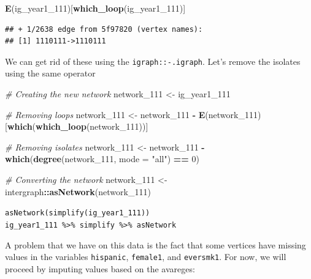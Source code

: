 \documentclass[]{book}
\newenvironment{Shaded}{\begin{snugshade}}{\end{snugshade}}
\newcommand{\CommentTok}[1]{\textcolor[rgb]{0.56,0.35,0.01}{\textit{#1}}}
\newcommand{\DataTypeTok}[1]{\textcolor[rgb]{0.13,0.29,0.53}{#1}}
\newcommand{\DecValTok}[1]{\textcolor[rgb]{0.00,0.00,0.81}{#1}}
\newcommand{\KeywordTok}[1]{\textcolor[rgb]{0.13,0.29,0.53}{\textbf{#1}}}
\newcommand{\NormalTok}[1]{#1}
\newcommand{\OperatorTok}[1]{\textcolor[rgb]{0.81,0.36,0.00}{\textbf{#1}}}
\newcommand{\StringTok}[1]{\textcolor[rgb]{0.31,0.60,0.02}{#1}}
\begin{document}
\begin{Shaded}
\begin{Highlighting}[]
\KeywordTok{E}\NormalTok{(ig_year1_}\DecValTok{111}\NormalTok{)[}\KeywordTok{which_loop}\NormalTok{(ig_year1_}\DecValTok{111}\NormalTok{)]}
\end{Highlighting}
\end{Shaded}

\begin{verbatim}
## + 1/2638 edge from 5f97820 (vertex names):
## [1] 1110111->1110111
\end{verbatim}

We can get rid of these using the \texttt{igraph::-.igraph}. Let's remove the isolates using the same operator

\begin{Shaded}
\begin{Highlighting}[]
\CommentTok{# Creating the new network}
\NormalTok{network_}\DecValTok{111}\NormalTok{ <-}\StringTok{ }\NormalTok{ig_year1_}\DecValTok{111}

\CommentTok{# Removing loops}
\NormalTok{network_}\DecValTok{111}\NormalTok{ <-}\StringTok{ }\NormalTok{network_}\DecValTok{111} \OperatorTok{-}\StringTok{ }\KeywordTok{E}\NormalTok{(network_}\DecValTok{111}\NormalTok{)[}\KeywordTok{which}\NormalTok{(}\KeywordTok{which_loop}\NormalTok{(network_}\DecValTok{111}\NormalTok{))]}

\CommentTok{# Removing isolates}
\NormalTok{network_}\DecValTok{111}\NormalTok{ <-}\StringTok{ }\NormalTok{network_}\DecValTok{111} \OperatorTok{-}\StringTok{ }\KeywordTok{which}\NormalTok{(}\KeywordTok{degree}\NormalTok{(network_}\DecValTok{111}\NormalTok{, }\DataTypeTok{mode =} \StringTok{"all"}\NormalTok{) }\OperatorTok{==}\StringTok{ }\DecValTok{0}\NormalTok{)}

\CommentTok{# Converting the network}
\NormalTok{network_}\DecValTok{111}\NormalTok{ <-}\StringTok{ }\NormalTok{intergraph}\OperatorTok{::}\KeywordTok{asNetwork}\NormalTok{(network_}\DecValTok{111}\NormalTok{)}
\end{Highlighting}
\end{Shaded}

\texttt{asNetwork(simplify(ig\_year1\_111))}
\texttt{ig\_year1\_111\ \%\textgreater{}\%\ simplify\ \%\textgreater{}\%\ asNetwork}

A problem that we have on this data is the fact that some vertices have
missing values in the variables \texttt{hispanic}, \texttt{female1}, and \texttt{eversmk1}. For now,
we will proceed by imputing values based on the avareges:
\end{document}
